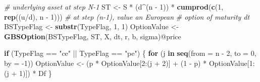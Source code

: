 \documentclass[justified]{tufte-book}
\newenvironment{Shaded}{}{}
\newcommand{\CommentTok}[1]{\textcolor[rgb]{0.38,0.63,0.69}{\textit{#1}}}
\newcommand{\ControlFlowTok}[1]{\textcolor[rgb]{0.00,0.44,0.13}{\textbf{#1}}}
\newcommand{\DataTypeTok}[1]{\textcolor[rgb]{0.56,0.13,0.00}{#1}}
\newcommand{\DecValTok}[1]{\textcolor[rgb]{0.25,0.63,0.44}{#1}}
\newcommand{\KeywordTok}[1]{\textcolor[rgb]{0.00,0.44,0.13}{\textbf{#1}}}
\newcommand{\NormalTok}[1]{#1}
\newcommand{\OperatorTok}[1]{\textcolor[rgb]{0.40,0.40,0.40}{#1}}
\newcommand{\StringTok}[1]{\textcolor[rgb]{0.25,0.44,0.63}{#1}}
\begin{document}
\begin{Shaded}
\begin{Highlighting}[]
    \CommentTok{\# underlying asset at step N{-}1}
\NormalTok{    ST \textless{}{-}}\StringTok{ }\NormalTok{S }\OperatorTok{*}\StringTok{ }\NormalTok{(d}\OperatorTok{\^{}}\NormalTok{(n }\OperatorTok{{-}}\StringTok{ }\DecValTok{1}\NormalTok{)) }\OperatorTok{*}\StringTok{ }\KeywordTok{cumprod}\NormalTok{(}\KeywordTok{c}\NormalTok{(}\DecValTok{1}\NormalTok{, }\KeywordTok{rep}\NormalTok{((u}\OperatorTok{/}\NormalTok{d),}
\NormalTok{        n }\OperatorTok{{-}}\StringTok{ }\DecValTok{1}\NormalTok{)))}
    \CommentTok{\# at step (n{-}1), value an European}
    \CommentTok{\# option of maturity dt}
\NormalTok{    BSTypeFlag \textless{}{-}}\StringTok{ }\KeywordTok{substr}\NormalTok{(TypeFlag, }\DecValTok{1}\NormalTok{, }\DecValTok{1}\NormalTok{)}
\NormalTok{    OptionValue \textless{}{-}}\StringTok{ }\KeywordTok{GBSOption}\NormalTok{(BSTypeFlag, ST, X,}
\NormalTok{        dt, r, b, sigma)}\OperatorTok{@}\NormalTok{price}

    \ControlFlowTok{if}\NormalTok{ (TypeFlag }\OperatorTok{==}\StringTok{ "ce"} \OperatorTok{||}\StringTok{ }\NormalTok{TypeFlag }\OperatorTok{==}\StringTok{ "pe"}\NormalTok{) \{}
        \ControlFlowTok{for}\NormalTok{ (j }\ControlFlowTok{in} \KeywordTok{seq}\NormalTok{(}\DataTypeTok{from =}\NormalTok{ n }\OperatorTok{{-}}\StringTok{ }\DecValTok{2}\NormalTok{, }\DataTypeTok{to =} \DecValTok{0}\NormalTok{, }\DataTypeTok{by =} \DecValTok{{-}1}\NormalTok{)) OptionValue \textless{}{-}}\StringTok{ }\NormalTok{(p }\OperatorTok{*}
\StringTok{            }\NormalTok{OptionValue[}\DecValTok{2}\OperatorTok{:}\NormalTok{(j }\OperatorTok{+}\StringTok{ }\DecValTok{2}\NormalTok{)] }\OperatorTok{+}\StringTok{ }\NormalTok{(}\DecValTok{1} \OperatorTok{{-}}\StringTok{ }\NormalTok{p) }\OperatorTok{*}
\StringTok{            }\NormalTok{OptionValue[}\DecValTok{1}\OperatorTok{:}\NormalTok{(j }\OperatorTok{+}\StringTok{ }\DecValTok{1}\NormalTok{)]) }\OperatorTok{*}\StringTok{ }\NormalTok{Df}
\NormalTok{    \}}


\end{Highlighting}
\end{Shaded}
\end{document}
